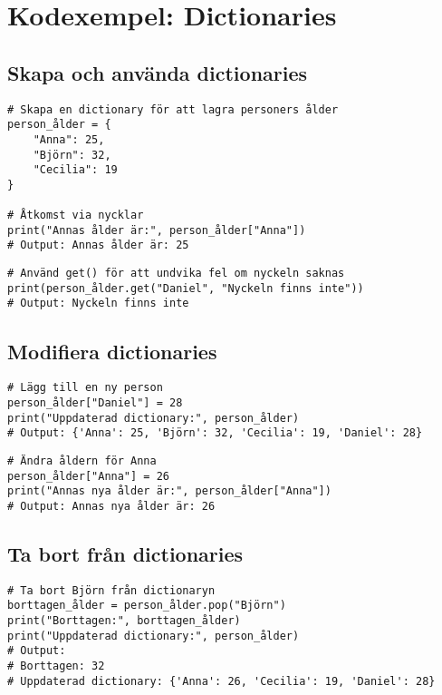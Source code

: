 \section{Kodexempel: Dictionaries}
\label{examples:dictionary}
\subsection*{Skapa och använda dictionaries}

\begin{lstlisting}[title=Exempel 1: Skapa en dictionary]
# Skapa en dictionary för att lagra personers ålder
person_ålder = {
    "Anna": 25,
    "Björn": 32,
    "Cecilia": 19
}

# Åtkomst via nycklar
print("Annas ålder är:", person_ålder["Anna"])
# Output: Annas ålder är: 25
\end{lstlisting}

\begin{lstlisting}[title=Exempel 2: Åtkomst med \texttt{get()}]
# Använd get() för att undvika fel om nyckeln saknas
print(person_ålder.get("Daniel", "Nyckeln finns inte"))
# Output: Nyckeln finns inte
\end{lstlisting}

\subsection*{Modifiera dictionaries}

\begin{lstlisting}[title=Exempel 3: Lägga till en ny nyckel och värde]
# Lägg till en ny person
person_ålder["Daniel"] = 28
print("Uppdaterad dictionary:", person_ålder)
# Output: {'Anna': 25, 'Björn': 32, 'Cecilia': 19, 'Daniel': 28}
\end{lstlisting}

\begin{lstlisting}[title=Exempel 4: Uppdatera ett värde]
# Ändra åldern för Anna
person_ålder["Anna"] = 26
print("Annas nya ålder är:", person_ålder["Anna"])
# Output: Annas nya ålder är: 26
\end{lstlisting}

\subsection*{Ta bort från dictionaries}

\begin{lstlisting}[title=Exempel 5: Ta bort en nyckel med \texttt{pop()}]
# Ta bort Björn från dictionaryn
borttagen_ålder = person_ålder.pop("Björn")
print("Borttagen:", borttagen_ålder)
print("Uppdaterad dictionary:", person_ålder)
# Output: 
# Borttagen: 32
# Uppdaterad dictionary: {'Anna': 26, 'Cecilia': 19, 'Daniel': 28}
\end{lstlisting}

